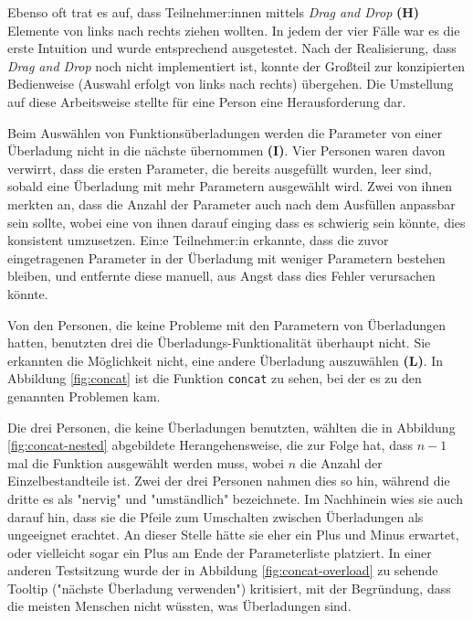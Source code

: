 \pskip
Ebenso oft trat es auf, dass Teilnehmer:innen mittels \textit{Drag and Drop} \textbf{(H)} Elemente von links nach rechts ziehen wollten. In jedem der vier Fälle war es die erste Intuition und wurde entsprechend ausgetestet. Nach der Realisierung, dass \textit{Drag and Drop} noch nicht implementiert ist, konnte der Großteil zur konzipierten Bedienweise (Auswahl erfolgt von links nach rechts) übergehen. Die Umstellung auf diese Arbeitsweise stellte für eine Person eine Herausforderung dar.

\pskip
Beim Auswählen von Funktionsüberladungen werden die Parameter von einer Überladung nicht in die nächste übernommen \textbf{(I)}. Vier Personen waren davon verwirrt, dass die ersten Parameter, die bereits ausgefüllt wurden, leer sind, sobald eine Überladung mit mehr Parametern ausgewählt wird. Zwei von ihnen merkten an, dass die Anzahl der Parameter auch nach dem Ausfüllen anpassbar sein sollte, wobei eine von ihnen darauf einging dass es schwierig sein könnte, dies konsistent umzusetzen. Ein:e Teilnehmer:in erkannte, dass die zuvor eingetragenen Parameter in der Überladung mit weniger Parametern bestehen bleiben, und entfernte diese manuell, aus Angst dass dies Fehler verursachen könnte.

\pskip
Von den Personen, die keine Probleme mit den Parametern von Überladungen hatten, benutzten drei die Überladungs-Funktionalität überhaupt nicht. Sie erkannten die Möglichkeit nicht, eine andere Überladung auszuwählen \textbf{(L)}. In Abbildung \ref{fig:concat} ist die Funktion \texttt{concat} zu sehen, bei der es zu den genannten Problemen kam.

Die drei Personen, die keine Überladungen benutzten, wählten die in Abbildung \ref{fig:concat-nested} abgebildete Herangehensweise, die zur Folge hat, dass $n-1$ mal die Funktion ausgewählt werden muss, wobei $n$ die Anzahl der Einzelbestandteile ist. Zwei der drei Personen nahmen dies so hin, während die dritte es als "nervig" und "umständlich" bezeichnete. Im Nachhinein wies sie auch darauf hin, dass sie die Pfeile zum Umschalten zwischen Überladungen als ungeeignet erachtet. An dieser Stelle hätte sie eher ein Plus und Minus erwartet, oder vielleicht sogar ein Plus am Ende der Parameterliste platziert. In einer anderen Testsitzung wurde der in Abbildung \ref{fig:concat-overload} zu sehende Tooltip ("nächste Überladung verwenden") kritisiert, mit der Begründung, dass die meisten Menschen nicht wüssten, was Überladungen sind.

